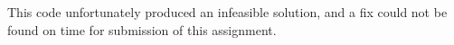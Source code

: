 

This code unfortunately produced an infeasible solution, and a fix could not be
found on time for submission of this assignment.
